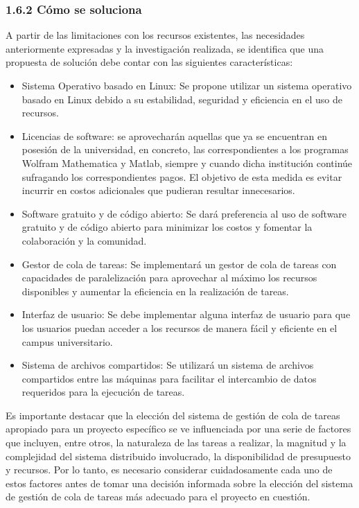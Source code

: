 \begin{spacing}{1.5}
    \subsubsection{1.6.2 Cómo se soluciona}
    A partir de las limitaciones con los recursos existentes, las necesidades anteriormente expresadas y la investigación realizada, se identifica que una propuesta de solución debe contar con las siguientes características:
    \begin{itemize}
      \item Sistema Operativo basado en Linux: Se propone utilizar un sistema operativo basado en Linux debido a su estabilidad, seguridad y eficiencia en el uso de recursos.
      \item Licencias de software: se aprovecharán aquellas que ya se encuentran en posesión de la universidad, en concreto, las correspondientes a los programas Wolfram Mathematica y Matlab, siempre y cuando dicha institución continúe sufragando los correspondientes pagos. El objetivo de esta medida es evitar incurrir en costos adicionales que pudieran resultar innecesarios.
      \item Software gratuito y de código abierto: Se dará preferencia al uso de software gratuito y de código abierto para minimizar los costos y fomentar la colaboración y la comunidad.
      \item Gestor de cola de tareas: Se implementará un gestor de cola de tareas con capacidades de paralelización para aprovechar al máximo los recursos disponibles y aumentar la eficiencia en la realización de tareas.
      \item Interfaz de usuario: Se debe implementar alguna interfaz de usuario para que los usuarios puedan acceder a los recursos de manera fácil y eficiente en el campus universitario.
      \item Sistema de archivos compartidos: Se utilizará un sistema de archivos compartidos entre las máquinas para facilitar el intercambio de datos requeridos para la ejecución de tareas.
    \end{itemize}
    Es importante destacar que la elección del sistema de gestión de cola de tareas apropiado para un proyecto específico se ve influenciada por una serie de factores que incluyen, entre otros, la naturaleza de las tareas a realizar, la magnitud y la complejidad del sistema distribuido involucrado, la disponibilidad de presupuesto y recursos. Por lo tanto, es necesario considerar cuidadosamente cada uno de estos factores antes de tomar una decisión informada sobre la elección del sistema de gestión de cola de tareas más adecuado para el proyecto en cuestión.


\end{spacing}
